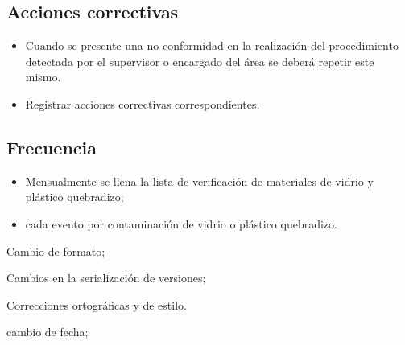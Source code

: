 \subsection{Acciones correctivas}
\begin{itemize}
	\item Cuando se presente una no conformidad en la realización del procedimiento detectada por el supervisor o encargado del área se deberá repetir este mismo.
	\item Registrar acciones correctivas correspondientes.
\end{itemize}

\subsection{Frecuencia}
\begin{itemize}
	\item Mensualmente se llena la lista de verificación de materiales de vidrio y plástico quebradizo;
	\item cada evento por contaminación de vidrio o plástico quebradizo.
\end{itemize}


\begin{changelog}[title=Registro de cambios,simple, sectioncmd=\subsection*,label=changelog-\thesection-\MayorVer.\MenorVer]
	\begin{version}[v=\MayorVer.\MenorVer, date=2023--01, author=Pablo E. Alanis]
		\item Cambio de formato;
		\item Cambios en la serialización de versiones;
		\item Correcciones ortográficas y de estilo.
	\end{version}

	\begin{version}[v=1.7, date=2022--05, author=Alonso M.]
		\item cambio de fecha;
	\end{version}

\end{changelog}

